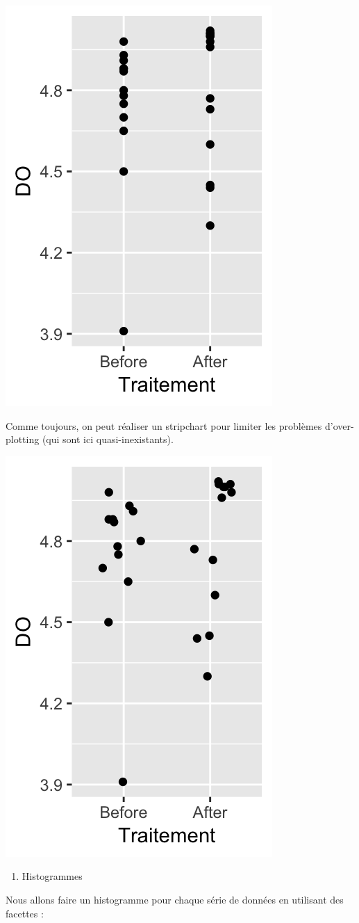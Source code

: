 \documentclass[a4paperpaper,]{article}
\newenvironment{Shaded}{\begin{snugshade}}{\end{snugshade}}
\newcommand{\DataTypeTok}[1]{\textcolor[rgb]{0.00,0.34,0.68}{#1}}
\newcommand{\DecValTok}[1]{\textcolor[rgb]{0.69,0.50,0.00}{#1}}
\newcommand{\FloatTok}[1]{\textcolor[rgb]{0.69,0.50,0.00}{#1}}
\newcommand{\KeywordTok}[1]{\textcolor[rgb]{0.12,0.11,0.11}{\textbf{#1}}}
\newcommand{\NormalTok}[1]{\textcolor[rgb]{0.12,0.11,0.11}{#1}}
\newcommand{\OperatorTok}[1]{\textcolor[rgb]{0.12,0.11,0.11}{#1}}
\newcommand{\StringTok}[1]{\textcolor[rgb]{0.75,0.01,0.01}{#1}}
\providecommand{\tightlist}{%
  \setlength{\itemsep}{0pt}\setlength{\parskip}{0pt}}
\begin{document}
\begin{center}\includegraphics[width=0.25\linewidth]{figure/unnamed-chunk-32-1} \end{center}

Comme toujours, on peut réaliser un stripchart pour limiter les problèmes d'over-plotting (qui sont ici quasi-inexistants).

\begin{Shaded}
\end{Shaded}

\begin{center}\includegraphics[width=0.25\linewidth]{figure/unnamed-chunk-33-1} \end{center}

\begin{enumerate}
\def\labelenumi{\arabic{enumi}.}
\setcounter{enumi}{1}
\tightlist
\item
  Histogrammes
\end{enumerate}

Nous allons faire un histogramme pour chaque série de données en utilisant des facettes :
\end{document}
